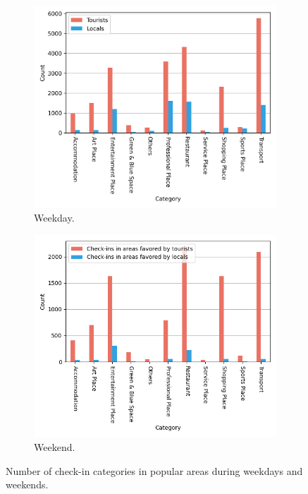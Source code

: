 \documentclass{article}
\begin{document}
\begin{figure}[!h]

\begin{subfigure}{0.5\textwidth}
\includegraphics[width=1\linewidth]{figures/diff_pop_category_weekday.png} 
\caption{Weekday.}
\label{fig:diff_pop_category_weekday}
\end{subfigure}
\begin{subfigure}{0.5\textwidth}
\includegraphics[width=1\linewidth]{figures/diff_pop_category_weekend.png}
\caption{Weekend.}
\label{fig:diff_pop_category_weekend}
\end{subfigure}

\caption{Number of check-in categories in popular areas during weekdays and weekends.} \label{fig:hotspots_category_week}
\end{figure}
\end{document}
